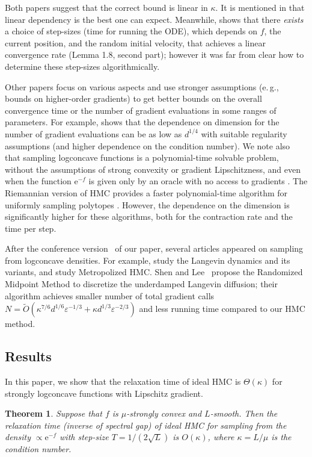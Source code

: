 \documentclass[11pt]{article}
\numberwithin{equation}{section}
\newtheorem{theorem}{Theorem}[section]
\theoremstyle{definition}
\theoremstyle{plain}
\newcommand{\eee}{\mathrm e}
\newcommand{\eg}{e.\,g.}
\newcommand{\eps}{\varepsilon}
\begin{document}
Both papers suggest that the correct bound is linear in $\kappa$. 
It is mentioned in \cite{MS17} that linear dependency is the best one can expect. 
Meanwhile, \cite{LSV18} shows that there {\em exists} a choice of step-sizes (time for running the ODE), which depends on $f$, the current position, and the random initial velocity, that achieves a linear convergence rate (Lemma 1.8, second part); however it was far from clear how to determine these step-sizes algorithmically.  

Other papers focus on various aspects and use stronger assumptions (\eg, bounds on higher-order gradients) to get better bounds on the overall convergence time or the number of gradient evaluations in some ranges of parameters. For example, \cite{MV18} shows that the dependence on dimension for the number of gradient evaluations can be as low as $d^{1/4}$ with suitable regularity assumptions (and higher dependence on the condition number). We note also that sampling logconcave functions is a polynomial-time solvable problem, without the assumptions of strong convexity or gradient Lipschitzness, and even when the function $\eee^{-f}$ is given only by an oracle with no access to gradients \cite{AK91, LV06}. The Riemannian version of HMC provides a faster polynomial-time algorithm for uniformly sampling polytopes \cite{LV18}. However, the dependence on the dimension is significantly higher for these algorithms, both for the contraction rate and the time per step. 

After the %
conference version~\cite{conf-version}   %
of our paper, %
several articles appeared  %
%
on sampling from logconcave densities. 
For example, \cite{CLW19, DRK19, MMWBJ19, SL19, W19} study the 
Langevin dynamics and its variants, and \cite{CDWY19, LST20} 
study Metropolized HMC. 
%
%
%
Shen and Lee~\cite{SL19} propose the  %
Randomized Midpoint Method to discretize the underdamped Langevin diffusion; 
their algorithm achieves smaller number of total gradient calls
%
%
%
$N = \tilde{O}( \kappa^{7/6} d^{1/6} \eps^{-1/3}
 + \kappa d^{1/3} \eps^{-2/3} )$ 
and less running time compared to our HMC method. 
%
%
%
%

\subsection{Results}
In this paper, we show that the relaxation time of ideal HMC is $\Theta(\kappa)$ for strongly logconcave functions with Lipschitz gradient.  
\begin{theorem}\label{thm:rel_upper}
	Suppose that $f$ is $\mu$-strongly convex and $L$-smooth. Then the relaxation time (inverse of spectral gap) of ideal HMC for sampling from the density $\propto \eee^{-f}$ with step-size $T = 1/(2\sqrt{L})$ is $O(\kappa)$, 
	where $\kappa = L/\mu$ is the condition number. 
\end{theorem}
\end{document}
